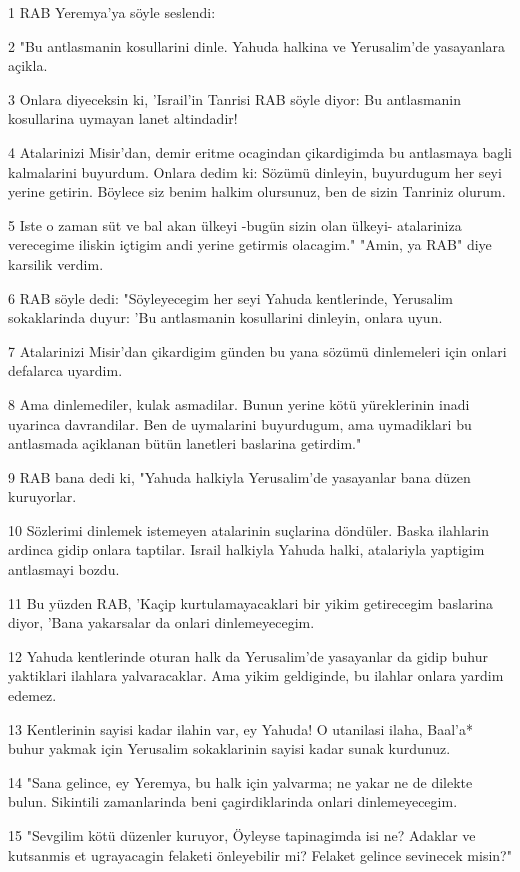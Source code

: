 \par 1 RAB Yeremya'ya söyle seslendi:
\par 2 "Bu antlasmanin kosullarini dinle. Yahuda halkina ve Yerusalim'de yasayanlara açikla.
\par 3 Onlara diyeceksin ki, 'Israil'in Tanrisi RAB söyle diyor: Bu antlasmanin kosullarina uymayan lanet altindadir!
\par 4 Atalarinizi Misir'dan, demir eritme ocagindan çikardigimda bu antlasmaya bagli kalmalarini buyurdum. Onlara dedim ki: Sözümü dinleyin, buyurdugum her seyi yerine getirin. Böylece siz benim halkim olursunuz, ben de sizin Tanriniz olurum.
\par 5 Iste o zaman süt ve bal akan ülkeyi -bugün sizin olan ülkeyi- atalariniza verecegime iliskin içtigim andi yerine getirmis olacagim." "Amin, ya RAB" diye karsilik verdim.
\par 6 RAB söyle dedi: "Söyleyecegim her seyi Yahuda kentlerinde, Yerusalim sokaklarinda duyur: 'Bu antlasmanin kosullarini dinleyin, onlara uyun.
\par 7 Atalarinizi Misir'dan çikardigim günden bu yana sözümü dinlemeleri için onlari defalarca uyardim.
\par 8 Ama dinlemediler, kulak asmadilar. Bunun yerine kötü yüreklerinin inadi uyarinca davrandilar. Ben de uymalarini buyurdugum, ama uymadiklari bu antlasmada açiklanan bütün lanetleri baslarina getirdim."
\par 9 RAB bana dedi ki, "Yahuda halkiyla Yerusalim'de yasayanlar bana düzen kuruyorlar.
\par 10 Sözlerimi dinlemek istemeyen atalarinin suçlarina döndüler. Baska ilahlarin ardinca gidip onlara taptilar. Israil halkiyla Yahuda halki, atalariyla yaptigim antlasmayi bozdu.
\par 11 Bu yüzden RAB, 'Kaçip kurtulamayacaklari bir yikim getirecegim baslarina diyor, 'Bana yakarsalar da onlari dinlemeyecegim.
\par 12 Yahuda kentlerinde oturan halk da Yerusalim'de yasayanlar da gidip buhur yaktiklari ilahlara yalvaracaklar. Ama yikim geldiginde, bu ilahlar onlara yardim edemez.
\par 13 Kentlerinin sayisi kadar ilahin var, ey Yahuda! O utanilasi ilaha, Baal'a* buhur yakmak için Yerusalim sokaklarinin sayisi kadar sunak kurdunuz.
\par 14 "Sana gelince, ey Yeremya, bu halk için yalvarma; ne yakar ne de dilekte bulun. Sikintili zamanlarinda beni çagirdiklarinda onlari dinlemeyecegim.
\par 15 "Sevgilim kötü düzenler kuruyor, Öyleyse tapinagimda isi ne? Adaklar ve kutsanmis et ugrayacagin felaketi önleyebilir mi? Felaket gelince sevinecek misin?"
